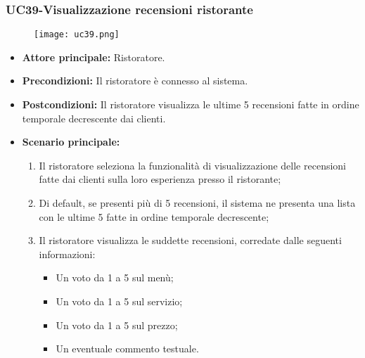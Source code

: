 \subsubsection{UC39-Visualizzazione recensioni ristorante}
\begin{figure}[h] \texttt{[image: uc39.png]} \end{figure}
\begin{itemize}
\item \textbf{Attore principale:} Ristoratore.
\item \textbf{Precondizioni:} Il ristoratore è connesso al sistema.
\item \textbf{Postcondizioni:} Il ristoratore visualizza le ultime 5 recensioni fatte in ordine temporale decrescente dai clienti.
\item \textbf{Scenario principale:}
\begin{enumerate}
    \item Il ristoratore seleziona la funzionalità di visualizzazione delle recensioni fatte dai clienti sulla loro esperienza presso il ristorante;
    \item Di default, se presenti più di 5 recensioni, il sistema ne presenta una lista con le ultime 5 fatte in ordine temporale decrescente;
    \item Il ristoratore visualizza le suddette recensioni, corredate dalle seguenti informazioni:
    \begin{itemize}
        \item Un voto da 1 a 5 sul menù;
        \item Un voto da 1 a 5 sul servizio;
        \item Un voto da 1 a 5 sul prezzo;
        \item Un eventuale commento testuale.
    \end{itemize}
\end{enumerate}
\end{itemize}


